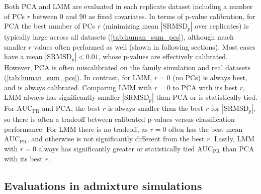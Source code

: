 \documentclass[11pt]{article}
\newcommand{\rmsd}{\text{SRMSD}_p}
\newcommand{\auc}{\text{AUC}_\text{PR}}
\begin{document}
\begin{linenumbers}
Both PCA and LMM are evaluated in each replicate dataset including a number of PCs $r$ between 0 and 90 as fixed covariates.
In terms of p-value calibration, for PCA the best number of PCs $r$ (minimizing mean $|\rmsd|$ over replicates) is typically large across all datasets (\cref{tab:human_sum_pcs}), although much smaller $r$ values often performed as well (shown in following sections).
Most cases have a mean $|\rmsd| < 0.01$, whose p-values are effectively calibrated.
However, PCA is often miscalibrated on the family simulation and real datasets (\cref{tab:human_sum_pcs}).
In contrast, for LMM, $r=0$ (no PCs) is always best, and is always calibrated.
Comparing LMM with $r=0$ to PCA with its best $r$, LMM always has significantly smaller $|\rmsd|$ than PCA or is statistically tied.
% 
For $\auc$ and PCA, the best $r$ is always smaller than the best $r$ for $|\rmsd|$, so there is often a tradeoff between calibrated p-values versus classification performance.
For LMM there is no tradeoff, as $r=0$ often has the best mean $\auc$, and otherwise is not significantly different from the best $r$.
Lastly, LMM with $r=0$ always has significantly greater or statistically tied $\auc$ than PCA with its best $r$.

\subsection{Evaluations in admixture simulations}


\end{linenumbers}
\end{document}
